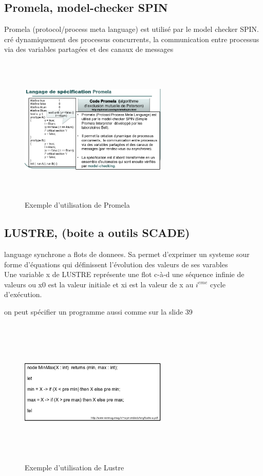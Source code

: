 \documentclass[oneside]{book}
\begin{document}
    \subsection{Promela, model-checker SPIN}
    Promela (protocol/process meta language) est utilisé par le model checker SPIN. cré dynamiquement des processus concurrents, la communication entre processus via des variables partagées et des canaux de messages\\
    
    \begin{figure}[!ht]
    	\centering
    	\includegraphics[width = 7cm, height = 7cm, keepaspectratio]{Images/exemple_promela.png}
    	\caption{Exemple d'utilisation de Promela}
    	\label{fig:PROMELA}
    \end{figure}
    
    \subsection{LUSTRE, (boite a outils SCADE)}
    language synchrone a flots de donnees. Sa permet d'exprimer un systeme sour forme d'équations qui définissent l'évolution des valeurs de ses varables\\
    
    Une variable x de LUSTRE représente une flot c-à-d une séquence infinie de valeurs ou x0 est la valeur initiale et xi est la valeur de x au $i^{eme}$ cycle d'exécution.
    
    on peut spécifier un programme aussi comme sur la slide 39\\
    \begin{figure}[!ht]
    	\centering
    	\includegraphics[width = 7cm, height = 7cm, keepaspectratio]{Images/exemple_lustre.png}
    	\caption{Exemple d'utilisation de Lustre}
    	\label{fig:ExempleLustre}
    \end{figure}
    
\end{document}
